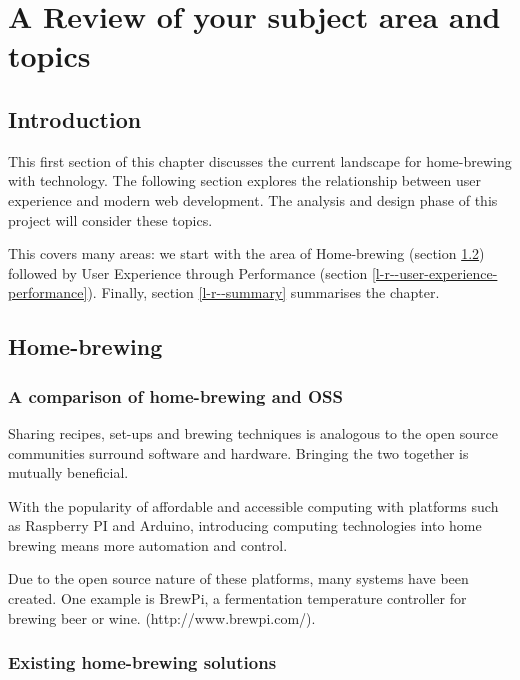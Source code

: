\chapter{A Review of your subject area and topics}

\section{Introduction} \label{l-r--introduction}

This first section of this chapter discusses the current landscape for home-brewing with technology. The following section explores the relationship between user experience and modern web development. The analysis and design phase of this project will consider these topics.


This covers many areas: we start with the area of Home-brewing (section \ref{l-r--home-brewing}) followed by User Experience through Performance (section \ref{l-r--user-experience-performance}). Finally, section \ref{l-r--summary} summarises the chapter.

\section{Home-brewing} \label{l-r--home-brewing}



\subsection{A comparison of home-brewing and OSS}

Sharing recipes, set-ups and brewing techniques is analogous to the open source communities surround software and hardware. Bringing the two together is mutually beneficial.

With the popularity of affordable and accessible computing with platforms such as Raspberry PI and Arduino, introducing computing technologies into home brewing means more automation and control.

Due to the open source nature of these platforms, many systems have been created. One example is BrewPi, a fermentation temperature controller for brewing beer or wine. (http://www.brewpi.com/).

\subsection{Existing home-brewing solutions}

